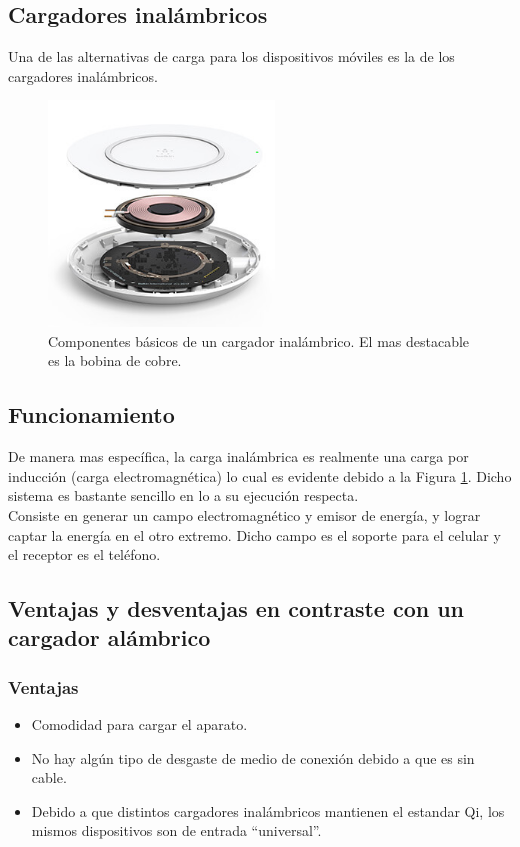 \documentclass[letterpaper, 12pt]{article}
\begin{document}
\begin{justify}
        \section{Cargadores inalámbricos}
        \justify
        Una de las alternativas de carga para los dispositivos móviles es la de los cargadores inalámbricos.\\
        \begin{figure}[H]
            \centering
            \label{fig:wireless}
            \includegraphics[width=6cm]{wireless.jpg}
            \caption{Componentes básicos de un cargador inalámbrico. El mas destacable es la bobina de cobre.}
        \end{figure}
        \subsection{Funcionamiento}
        \justify
        De manera mas específica, la carga inalámbrica es realmente una carga por inducción (carga electromagnética) lo cual es evidente debido a la Figura \ref{fig:wireless}. Dicho sistema es bastante sencillo en lo a su ejecución respecta.
        \\ Consiste en generar un campo electromagnético y emisor de energía, y lograr captar la energía en el otro extremo. Dicho campo es el soporte para el celular y el receptor es el teléfono.
        \subsection{Ventajas y desventajas en contraste con un cargador alámbrico}
        \subsubsection{Ventajas}
        \begin{itemize}
            \item Comodidad para cargar el aparato.
            \item No hay algún tipo de desgaste de medio de conexión debido a que es sin cable.
            \item Debido a que distintos cargadores inalámbricos mantienen el estandar Qi, los mismos dispositivos son de entrada ``universal''.
        \end{itemize}

\end{justify}
\end{document}
